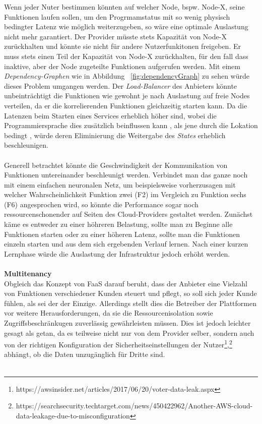 \documentclass[11pt]{article}
\begin{document}
Wenn jeder Nuter bestimmen könnten auf welcher Node, bspw. Node-X, seine Funktionen laufen sollen, um den Progrmamstatus mit so wenig physisch bedingter Latenz wie möglich weiterzugeben, so wäre eine optimale Auslastung nicht mehr garantiert. Der Provider müsste stets Kapazität von Node-X zurückhalten und könnte sie nicht für andere Nutzerfunkitonen freigeben. Er muss stets einen Teil der Kapazität von Node-X zurückhalten, für den fall dass inaktive, aber der Node zugeteilte Funktionen aufgerufen werden. Mit einem \textit{Dependency-Graphen} wie in Abbildung ~\ref{fig:dependencyGraph} zu sehen würde dieses Problem umgangen werden. Der \textit{Load-Balancer} des Anbieters könnte unbeinträchtigt die Funktionen wie gewohnt je nach Auslastung auf freie Nodes verteilen, da er die korrelierenden Funktionen \glqq gleichzeitig\grqq{} starten kann. Da die Latenzen beim Starten eines Services erheblich höher sind, wobei die Programmiersprache dies zusätzlich beinflussen kann \cite{manner2018cold}, als jene durch die Lokation bedingt \cite{aditya2019will} \cite{jackson2018investigation}, würde deren Eliminierung die Weitergabe des \textit{States} erheblich beschleunigen.\\\\
Generell betrachtet könnte die Geschwindigkeit der Kommunikation von Funktionen untereinander beschleunigt werden. Verbindet man das ganze noch mit einem einfachen neuronalen Netz, um beispielsweise vorherzusagen mit welcher Wahrscheinlichkeit Funktion zwei (F2) im Vergleich zu Funktion sechs (F6) angesprochen wird, so könnte die Performance sogar noch ressourcenschonender auf Seiten des Cloud-Providers gestaltet werden. Zunächst käme es entweder zu einer höhreren Belastung, sollte man zu Beginne alle Funktionen starten oder zu einer höheren Latenz, sollte man die Funktionen einzeln starten und aus dem sich ergebenden Verlauf lernen. Nach einer kurzen Lernphase würde die Auslastung der Infrastruktur jedoch erhöht werden.\\\\
\glqq \textbf{Multitenancy}\grqq{}\\
Obgleich das Konzept von FaaS darauf beruht, dass der Anbieter eine Vielzahl von Funktionen verschiedener Kunden steuert und pflegt, so soll sich jeder Kunde fühlen, als sei der der Einzige. Allerdings stellt dies die Betreiber der Plattformen vor weitere Herausforderungen, da sie die Ressourcenisolation sowie Zugriffsbeschränkugen zuverlässig gewährleisten müssen. Dies ist jedoch leichter gesagt als getan, da es teilweise nicht nur von dem Provider selber, sondern auch von der richtigen Konfiguration der Sicherheitseinstellungen der Nutzer\footnote{https://awsinsider.net/articles/2017/06/20/voter-data-leak.aspx},\footnote{https://searchsecurity.techtarget.com/news/450422962/Another-AWS-cloud-data-leakage-due-to-misconfiguration} abhängt, ob die Daten unzugänglich für Dritte sind.\\\\
\end{document}
